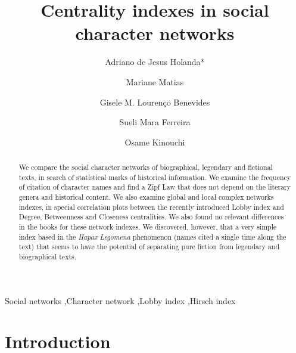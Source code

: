 \documentclass[review]{elsarticle}
\begin{document}
\begin{frontmatter}

\title{Centrality indexes in social character networks}

\author[1]{Adriano de Jesus Holanda*}
\author[1]{Mariane Matias}
\author[2]{Gisele M. Louren\c{c}o Benevides}
\author[1]{Sueli Mara Ferreira}
\author[1]{Osame Kinouchi}
\address[1]{Faculdade de Filosofia, 
Ci\^encias e Letras de Ribeir\~ao Preto\\
Universidade de S\~ao Paulo, Av. Bandeirantes 3900, CEP 14040-901, 
Ribeir\~ao Preto, SP, Brazil}
\address[2]{Prefeitura do Campus USP de Ribeir\~ao Preto\\
Universidade de S\~ao Paulo, Av. Bandeirantes 3900, CEP 14040-901, 
Ribeir\~ao Preto, SP, Brazil}


\begin{abstract}
We compare the social character networks of biographical, 
legendary and fictional texts,
in search of statistical marks of historical information. 
We examine the frequency of citation of character names and 
find a Zipf Law that does not depend on the literary 
genera and historical content.
We also examine global and local complex networks indexes,
in special correlation plots between the recently introduced Lobby index
and Degree, Betweenness and Closeness centralities. We also found no
relevant differences in the books for these network indexes.
We discovered, however, that a very simple index based in 
the \emph{Hapax Legomena} phenomenon (names cited a single 
time along the text) that seems to have the potential of separating
pure fiction from legendary and biographical texts.
\end{abstract}

\begin{keyword}
Social networks \sep Character network 
\sep Lobby index \sep Hirsch index 

\end{keyword}

\end{frontmatter}

\linenumbers

\section{Introduction}
\end{document}
